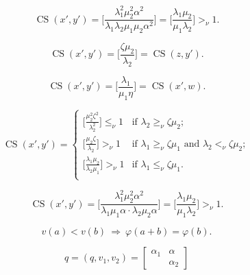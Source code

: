 \documentclass{article}
\begin{document}
\begin{equation}\label{eq:II.7.25}
{\operatorname{CS}}(x',y') = \bigg[ \frac{{\lambda}_1 ^2  \mu_2 ^2 {\alpha}^2}{{\lambda}_1 {\lambda}_2  \mu_1  \mu_2 {\alpha}^2 } \bigg]  =
\bigg[ \frac{ {\lambda}_1 \mu_2 }{\mu_1 {\lambda}_2 } \bigg] {>_\nu} 1.
\end{equation}

\begin{equation}\label{eq:II.7.26}
{\operatorname{CS}}(x',y') = \bigg[ \frac{{\zeta}  \mu_2 }{ {\lambda}_2} \bigg]  = {\operatorname{CS}}(z,y').
\end{equation}

\begin{equation}\label{eq:II.7.27}
{\operatorname{CS}}(x',y') = \bigg[ \frac{{\lambda}_1 }{ \mu_1 \eta} \bigg]  = {\operatorname{CS}}(x',w).
\end{equation}

\begin{equation}\label{eq:II.7.28}
{\operatorname{CS}}(x',y') =
\left\{
  \begin{array}{ll}
    \big[ \frac{  \mu_2 ^2 {\zeta}^2}{ {\lambda}_2^2} \big]  {\leq_\nu} 1  & \text{if } {\lambda}_2 {\geq_\nu} {\zeta} \mu_2; \\[2mm ]
        \big[ \frac{  \mu_2  {\zeta}}{ {\lambda}_2} \big]  {>_\nu} 1  & \text{if } {\lambda}_1 {\geq_\nu} {\zeta} \mu_1 \text{ and } {\lambda}_2 {<_\nu} {\zeta} \mu_2 ; \\[2mm]
        \big[ \frac{  {\lambda}_1 \mu_2}{ {\lambda}_2  \mu_1 } \big]  {>_\nu} 1  & \text{if } {\lambda}_1 {\leq_\nu} {\zeta} \mu_1.  \\
  \end{array}
\right.
\end{equation}

\begin{equation}\label{eq:II.7.29}
{\operatorname{CS}}(x',y') = \bigg[ \frac{{\lambda}_1 ^2  \mu_2 ^2 {\alpha}^2}{{\lambda}_1 \mu_1 {\alpha}  \cdot {\lambda}_2    \mu_2 {\alpha}  } \bigg]  =
\bigg[ \frac{ {\lambda}_1 \mu_2 }{\mu_1 {\lambda}_2 } \bigg] {>_\nu} 1.
\end{equation}

\begin{equation}\label{eq:II.8.1}
v(a)< v(b){\ {\Rightarrow} \ }{\varphi}(a+b)={\varphi}(b).\end{equation}

$$q=(q,v_1,v_2)=\begin{bmatrix} {\alpha}_1 & {\alpha}\\  &{\alpha}_2\end{bmatrix}$$
\end{document}
